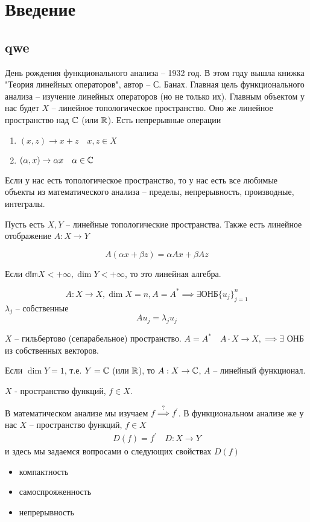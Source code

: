 \documentclass[document]{subfiles}
\begin{document}
\chapter{Введение}
\section{qwe}
День рождения функционального анализа -- 1932 год. В этом году вышла книжка "Теория линейных операторов", автор -- С. Банах. Главная цель функционального анализа --
 изучение линейных операторов (но не только их).
Главным объектом у нас будет $X$ -- линейное топологическое пространство. Оно же линейное пространство над $\mathbb{C}$ (или $\mathbb{R}$).
Есть непрерывные операции
\begin{enumerate}
    \item $(x,z) \rightarrow x + z \quad x,z \in X$
    \item $(\alpha,x) \rightarrow \alpha x \quad \alpha \in \mathbb{C}$
\end{enumerate}
Если у нас есть топологическое пространство, то у нас есть все любимые объекты из математического анализа -- пределы, непрерывность, производные, интегралы.

Пусть есть $X,Y$ -- линейные топологические пространства. Также есть линейное отображение $A: X \rightarrow Y$
\begin{definition}
    \[ A(\alpha x + \beta z) = \alpha A x + \beta A z \]
\end{definition}

Если $\mathbb{dim} X < + \infty, \dim Y < + \infty$, то это линейная алгебра.

\[A: X \rightarrow X, \dim X = n, A = A^* \implies \exists \text {ОНБ} \{u_j\}_{j=1}^n \]
$\lambda_j$ -- собственные 
\[ A u_j = \lambda_j u_j \]
\begin{theorem}[Гильберт]
    $X$ -- гильбертово (сепарабельное) пространство.
    $A = A^* \quad A \cdot X \rightarrow X, \implies \exists$ ОНБ из собственных векторов.
\end{theorem}

Если $\dim Y = 1$, т.е. $Y = \mathbb{C}$ (или $\mathbb{R}$), то $A: X \rightarrow \mathbb{C}$, $A$ -- линейный функционал.

$X$ - пространство функций, $f \in X$.

В математическом анализе мы изучаем $f \stackrel{?}{\implies} f^\prime$.
В функциональном анализе же у нас $X$ -- пространство функций, $f \in X$
\begin{gather}
    D(f) =  f^\prime \quad D: X \rightarrow Y
\end{gather}
и здесь мы задаемся вопросами о следующих свойствах $D(f)$
\begin{itemize}
    \item компактность
    \item самоспрояженность
    \item непрерывность
\end{itemize}
\end{document}
